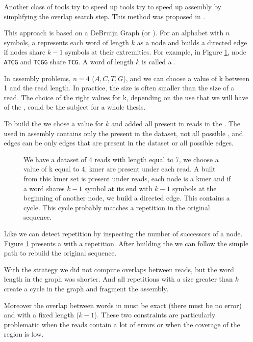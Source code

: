 \documentclass[main]{subfiles}
\begin{document}
Another class of tools try to speed up tools try to speed up assembly by simplifying the overlap search step. This method was proposed in  \cite{eulerian_approach}.

This approach is based on a DeBruijn Graph (or \DBG). For an alphabet with $n$ symbols, a \DBG represents each word of length $k$ as a node and builds a directed edge if nodes share $k - 1$ symbols at their extremities. For example, in Figure \ref{intro:fig:dbg:graph}, node \texttt{ATCG} and \texttt{TCGG} share \texttt{TCG}. A word of length $k$ is called a \kmer.

In assembly problems, $n = 4$ (${A, C, T, G}$), and we can choose a value of k between 1 and the read length. In practice, the size is often smaller than the size of a read. The choice of the right values for k, depending on the use that we will have of the \DBG, could be the subject for a whole thesis.

To build the \DBG we chose a value for $k$ and added all \kmer present in reads in the \DBG. The \DBG used in assembly contains only the \kmer present in the dataset, not all possible \kmer, and edges can be only edges that are present in the dataset or all possible edges.

\begin{figure}[ht]
    \center
    
    \caption{We have a dataset of 4 reads with length equal to 7, we choose a value of k equal to 4, kmer are present under each read. A \DBG built from this kmer set is present under reads, each node is a kmer and if a word shares $k - 1$ symbol at its end with $k - 1$ symbols at the beginning of another node, we build a directed edge. This \DBG contains a cycle. This cycle probably matches a repetition in the original sequence.}
    \label{intro:fig:dbg:graph}
\end{figure}

Like \OLC we can detect repetition by inspecting the number of successors of a node. Figure \ref{intro:fig:dbg:graph} presents a \DBG with a repetition. After building the \DBG we can follow the simple path to rebuild the original sequence.

With the \DBG strategy we did not compute overlaps between reads, but the word length in the graph was shorter. And all repetitions with a size greater than $k$ create a cycle in the graph and fragment the assembly.

Moreover the overlap between words in \DBG must be exact (there must be no error) and with a fixed length ($k - 1$). These two constraints are particularly problematic when the reads contain a lot of errors or when the coverage of the region is low.
\end{document}
